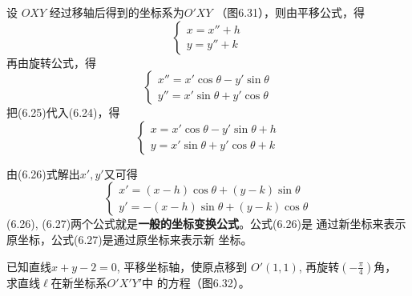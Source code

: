 设 $OXY$ 经过移轴后得到的坐标系为$O'XY$
（图6.31），则由平移公式，得
\begin{equation}
\begin{cases}
    x=x''+h\\
    y=y''+k
\end{cases}
\end{equation}
再由旋转公式，得
\begin{equation}
    \begin{cases}
        x''=x'\cos\theta-y'\sin\theta\\
        y''=x'\sin\theta+y'\cos\theta
    \end{cases}
\end{equation}
把(6.25)代入(6.24)，得
\begin{equation}
    \boxed{\begin{cases}
        x=x'\cos\theta-y'\sin\theta+h\\
        y=x'\sin\theta+y'\cos\theta+k
    \end{cases} } 
\end{equation}

由(6.26)式解出$x',y'$又可得
\begin{equation}
\boxed{\begin{cases}
    x'=(x-h)\cos\theta+(y-k)\sin\theta\\
    y'=-(x-h)\sin\theta+(y-k)\cos\theta
\end{cases} }
\end{equation}
(6.26), (6.27)两个公式就是\textbf{一般的坐标变换公式}。公式(6.26)是
通过新坐标来表示原坐标，公式(6.27)是通过原坐标来表示新
坐标。

\begin{example}
    已知直线$x+y-2=0$, 
平移坐标轴，使原点移到
$O'(1,1)$, 再旋转$\left(-\frac{\pi}{4}\right)$角，
求直线$\ell$在新坐标系$O'X'Y'$中
的方程（图6.32）。
\end{example}

\begin{figure}[htp]
    \centering
{}

    \caption{}
\end{figure}

